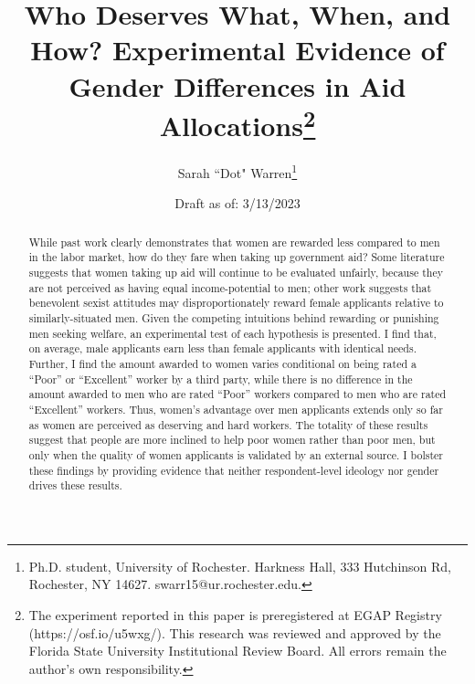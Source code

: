 \documentclass[12pt]{article}%
\author{Sarah ``Dot" Warren\thanks{Ph.D. student, University of Rochester. Harkness Hall, 333 Hutchinson Rd, Rochester, NY 14627. swarr15@ur.rochester.edu.}}
\title{Who Deserves What, When, and How? Experimental Evidence of Gender Differences in Aid Allocations\thanks{The experiment reported in this paper is preregistered at EGAP Registry (https://osf.io/u5wxg/). This research was reviewed and approved by the Florida State University Institutional Review Board. All errors remain the author's own responsibility.}}
\date{Draft as of: 3/13/2023}
\begin{document}
\maketitle
\thispagestyle{empty}


\begin{abstract}
While past work clearly demonstrates that women are rewarded less compared to men in the labor market, how do they fare when taking up government aid? Some literature suggests that women taking up aid will continue to be evaluated unfairly, because they are not perceived as having equal income-potential to men; other work suggests that benevolent sexist attitudes may disproportionately reward female applicants relative to similarly-situated men. Given the competing intuitions behind rewarding or punishing men seeking welfare, an experimental test of each hypothesis is presented. I find that, on average, male applicants earn less than female applicants with identical needs. Further, I find the amount awarded to women varies conditional on being rated a ``Poor” or ``Excellent” worker by a third party, while there is no difference in the amount awarded to men who are rated ``Poor” workers compared to men who are rated ``Excellent” workers. Thus, women’s advantage over men applicants extends only so far as women are perceived as deserving and hard workers. The totality of these results suggest that people are more inclined to help poor women rather than poor men, but only when the quality of women applicants is validated by an external source. I bolster these findings by providing evidence that neither respondent-level ideology nor gender drives these results.


\end{abstract}


\newpage
\end{document}
